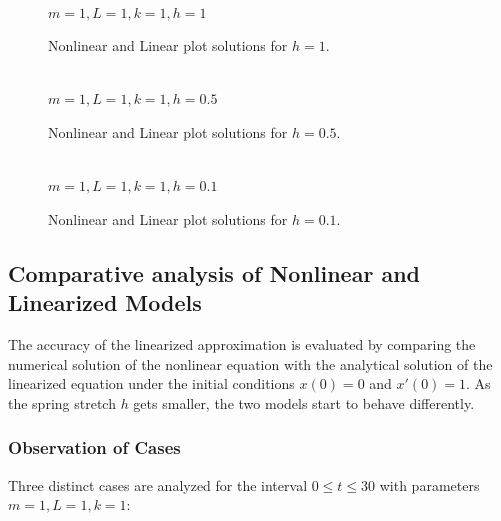 \documentclass[12pt, a4paper]{report}
\renewcommand{\eqref}[1]{\originaleqref{#1}}
\begin{document}
	\begin{figure}[H]
		 \\
		\centering \small $m = 1, L = 1, k = 1, h = 1$
		
		\caption{Nonlinear and Linear plot solutions for $h = 1$.}
	\end{figure}

	\begin{figure}[H]
		 \\
		\centering \small $m = 1, L = 1, k = 1, h = 0.5$
		
		\caption{Nonlinear and Linear plot solutions for $h = 0.5$.}
	\end{figure}

	\begin{figure}[H]
		 \\
		\centering \small $m = 1, L = 1, k = 1, h = 0.1$
		
		\caption{Nonlinear and Linear plot solutions for $h = 0.1$.}
	\end{figure}

	
	\subsection{Comparative analysis of Nonlinear and Linearized Models}
	
	The accuracy of the linearized approximation is evaluated by comparing the numerical solution of the nonlinear equation \eqref{eq:1} with the analytical solution of the linearized equation \eqref{eq:problem3:main} under the initial conditions $x(0) = 0$ and $x'(0) = 1$. As the spring stretch $h$ gets smaller, the two models start to behave differently.
	
	\subsubsection{Observation of Cases}
	
	Three distinct cases are analyzed for the interval $0 \le t \le 30$ with parameters $m=1, L=1, k=1$:
	
\end{document}
